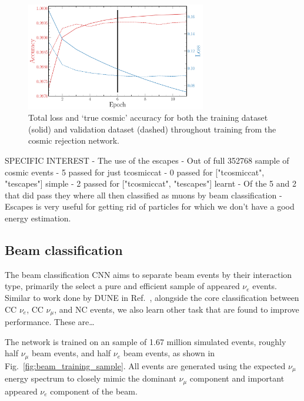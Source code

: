 \begin{figure} %
    \includegraphics[width=0.7\textwidth]{diagrams/6-cvn/chipsnet/final_cosmic_history.pdf}
    \caption[Loss and accuracy throughout training for the cosmic rejection network.]
    {Total loss and `true cosmic' accuracy for both the training dataset (solid) and validation
        dataset (dashed) throughout training from the cosmic rejection network.}
    \label{fig:final_cosmic_history}
\end{figure}

SPECIFIC INTEREST
- The use of the escapes
- Out of full 352768 sample of cosmic events
- 5 passed for just tcosmiccat
- 0 passed for ["tcosmiccat", "tescapes"] simple
- 2 passed for ["tcosmiccat", "tescapes"] learnt
- Of the 5 and 2 that did pass they where all then classified as muons by beam classification
- Escapes is very useful for getting rid of particles for which we don't have a good energy
estimation.

\subsection{Beam classification}%
\label{sec:cvn_specific_beam} %

The beam classification CNN aims to separate beam events by their interaction type, primarily the
select a pure and efficient sample of appeared $\nu_{e}$ events. Similar to work done by DUNE in
Ref.~\cite{collaboration2020}, alongside the core classification between CC $\nu_{e}$, CC
$\nu_{\mu}$, and NC events, we also learn other task that are found to improve performance. These
are\dots

The network is trained on an sample of 1.67 million simulated events, roughly half $\nu_{\mu}$
beam events, and half $\nu_{e}$ beam events, as shown in Fig.~\ref{fig:beam_training_sample}.
All events are generated using the expected \chips $\nu_{\mu}$ energy spectrum to closely mimic
the dominant $\nu_{\mu}$ component and important appeared $\nu_{e}$ component of the beam.

